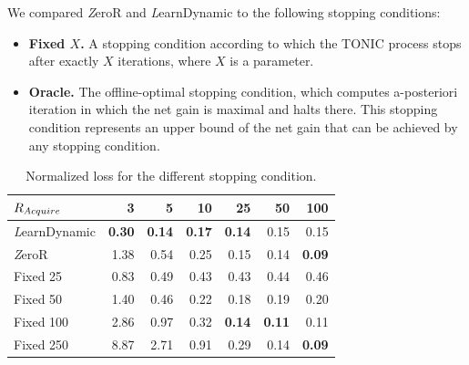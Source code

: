 \documentclass[journal]{IEEEtran}
\newcommand{\learnFixed}{{\textit ZeroR}}
\newcommand{\learnDynamic}{{\textit LearnDynamic}}
\newcommand{\Acquire}{{\textit Acquire}}
\begin{document}
We compared \learnFixed{} and \learnDynamic{} to the following stopping conditions: 
\begin{itemize}
\item {\bf Fixed $X$.} A stopping condition according to which 
the TONIC process stops after exactly $X$ iterations, where $X$ is a parameter. 
\item {\bf Oracle.} The offline-optimal stopping condition, which computes a-posteriori iteration in which the net gain is maximal and halts there. This stopping condition represents an upper bound of the net gain that can be achieved by any stopping condition. 
\end{itemize}

\begin{table}
\centering
\begin{tabular}{|l|r|r|r|r|r|r|}
\hline
$R_{\Acquire{}}$   &    3 & 5 & 10 & 25 & 50 & 100 \\
\hline
\learnDynamic{} & \textbf{0.30}         & \textbf{0.14}         & \textbf{0.17}          & \textbf{0.14}          & 0.15                   & 0.15                    \\
\learnFixed{}   & 1.38                  & 0.54                  & 0.25                   & 0.15                   & 0.14                   & \textbf{0.09}           \\
Fixed 25     & 0.83                  & 0.49                  & 0.43                   & 0.43                   & 0.44                   & 0.46                    \\
Fixed 50     & 1.40                  & 0.46                  & 0.22                   & 0.18                   & 0.19                   & 0.20                    \\
Fixed 100    & 2.86                  & 0.97                  & 0.32                   & \textbf{0.14}          & \textbf{0.11}          & 0.11                    \\
Fixed 250    & 8.87                  & 2.71                  & 0.91                   & 0.29                   & 0.14                   & \textbf{0.09}  \\
\hline
\end{tabular}
\caption{Normalized loss for the different stopping condition.}
\label{tab:stopping}
\end{table}
\end{document}
